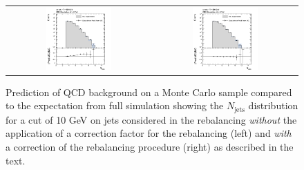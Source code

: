 \begin{figure}[!t]
  \centering
  \begin{tabular}{cc}
                \includegraphics[width=0.47\textwidth]{figures/NJets_baseline_withoutMHT_madgraph_DR53X_chs_TuneZ2star_pt10_withoutPUReweighting_DoNotUseRebCorrection_v1.png} &
                \includegraphics[width=0.47\textwidth]{figures/NJets_baseline_withoutMHT_madgraph_DR53X_chs_TuneZ2star_pt10_withoutPUReweighting_UseRebCorrection_v1.png} 

  \end{tabular}
  \caption{Prediction of QCD background on a Monte Carlo sample compared to the expectation from full simulation showing the $N_{\text{jets}}$ distribution for a \pt cut of 10 GeV on jets considered in the rebalancing \textit{without} the application of a correction factor for the rebalancing (left) and \textit{with} a correction of the rebalancing procedure (right) as described in the text.}
  \label{fig:qcd_rs_rebnjets}
\end{figure}

